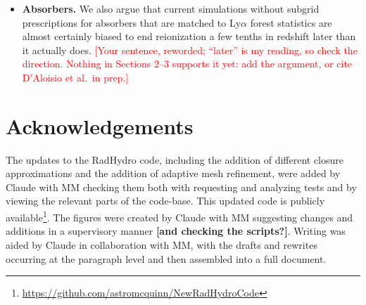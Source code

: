 \documentclass[iop]{openjournal}
\renewcommand{\draft}[1]{\textcolor{orange}{[draft: #1]}}%
\begin{document}
\begin{itemize}
\item \textbf{Absorbers.} We also argue that current simulations without subgrid prescriptions for absorbers that are matched to Ly$\alpha$ forest statistics are almost certainly biased to end reionization a few tenths in redshift later than it actually does. \textcolor{red}{[Your sentence, reworded; ``later'' is my reading, so check the direction. Nothing in Sections 2--3 supports it yet: add the argument, or cite D'Aloisio et al.\ in prep.]}
\end{itemize}

\section*{Acknowledgements}
The updates to the RadHydro code, including the addition of different closure approximations and the addition of adaptive mesh refinement, were added by Claude with MM checking them both with requesting and analyzing tests and by viewing the relevant parts of the code-base.  This updated code is publicly available\footnote{\url{https://github.com/astromcquinn/NewRadHydroCode}}.  The figures were created by Claude with MM suggesting changes and additions in a supervisory manner \textbf{[and checking the scripts?]}.  Writing was aided by Claude in collaboration with MM, with the drafts and rewrites occurring at the paragraph level and then assembled into a full document.




\appendix




\end{document}
